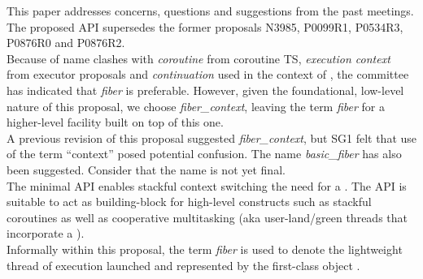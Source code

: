 
This paper addresses concerns, questions and suggestions from the past meetings.
The proposed API supersedes the former proposals N3985\cite{N3985},
P0099R1\cite{P0099R1}, P0534R3\cite{P0534R3}, P0876R0\cite{P0876R0}
and P0876R2\cite{P0876R2}.\\
Because of name clashes with \emph{coroutine} from coroutine TS,
\emph{execution context} from executor proposals and \emph{continuation} used
in the context of , the committee has indicated
that \emph{fiber} is preferable. However, given the foundational, low-level
nature of this proposal, we choose \emph{fiber\_context}, leaving the
term \emph{fiber} for a higher-level facility built on top of this one.\\

A previous revision of this proposal suggested \emph{fiber\_context}, but SG1
felt that use of the term ``context'' posed potential confusion. The name 
\emph{basic\_fiber} has also been suggested. Consider that the name is not yet
final.\\

The minimal API enables stackful context switching  the need for a
. The API is suitable to act as building-block for high-level
constructs such as stackful coroutines as well as cooperative multitasking
(aka user-land/green threads that incorporate a ).\\

Informally within this proposal, the term \emph{fiber} is used to denote the
lightweight thread of execution launched and represented by the first-class
object \fiber.

